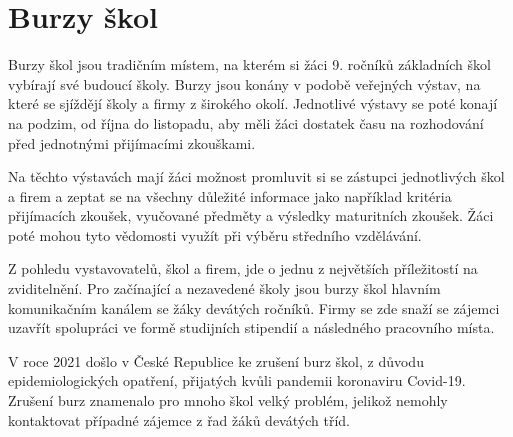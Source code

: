 \section{Burzy škol}

Burzy škol jsou tradičním místem, na kterém si žáci 9. ročníků základních škol vybírají své budoucí školy. Burzy jsou konány v podobě veřejných výstav, na které se sjíždějí školy a firmy z širokého okolí. Jednotlivé výstavy se poté konají na podzim, od října do listopadu, aby měli žáci dostatek času na rozhodování před jednotnými přijímacími zkouškami.

Na těchto výstavách mají žáci možnost promluvit si se zástupci jednotlivých škol a firem a zeptat se na všechny důležité informace jako například kritéria přijímacích zkoušek, vyučované předměty a výsledky maturitních zkoušek. Žáci poté mohou tyto vědomosti využít při výběru středního vzdělávání.

Z pohledu vystavovatelů, škol a firem, jde o jednu z největších příležitostí na zviditelnění. Pro začínající a nezavedené školy jsou burzy škol hlavním komunikačním kanálem se žáky devátých ročníků. Firmy se zde snaží se zájemci uzavřít spolupráci ve formě studijních stipendií a následného pracovního místa.

V roce 2021 došlo v České Republice ke zrušení burz škol, z důvodu epidemiologických opatření, přijatých kvůli pandemii koronaviru Covid-19. Zrušení burz znamenalo pro mnoho škol velký problém, jelikož nemohly kontaktovat případné zájemce z řad žáků devátých tříd.